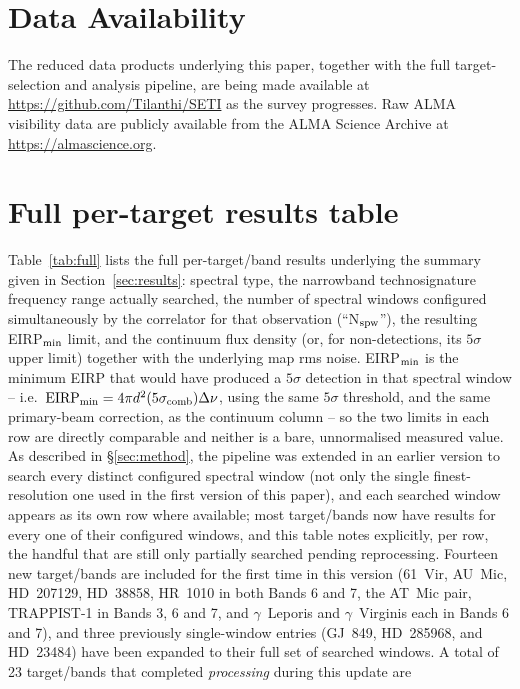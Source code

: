 \documentclass{openjournal}
\begin{document}
\section*{Data Availability}
The reduced data products underlying this paper, together with the full
target-selection and analysis pipeline, are being made available at
\url{https://github.com/Tilanthi/SETI} as the survey progresses. Raw ALMA
visibility data are publicly available from the ALMA Science Archive at
\url{https://almascience.org}.


\appendix
\section{Full per-target results table}
\label{app:table}

Table~\ref{tab:full} lists the full per-target/band results underlying the
summary given in Section~\ref{sec:results}: spectral type, the narrowband
technosignature frequency range actually searched, the number of spectral
windows configured simultaneously by the correlator for that observation
(``N$_{\rm spw}$''), the resulting EIRP$_{\rm min}$ limit, and the
continuum flux density (or, for non-detections, its $5\sigma$ upper
limit) together with the underlying map rms noise. EIRP$_{\rm min}$ is
the minimum EIRP that would have produced a $5\sigma$ detection in that
spectral window -- i.e.\ $\mathrm{EIRP_{min}} = 4\pi d^{2}(5\sigma_{\rm
comb})\Delta\nu$, using the same $5\sigma$ threshold, and the same
primary-beam correction, as the continuum column -- so the two limits in
each row are directly comparable and neither is a bare, unnormalised
measured value. As described in \S\ref{sec:method}, the pipeline was
extended in an earlier version to search every distinct configured
spectral window (not only the single finest-resolution one used in the
first version of this paper), and each searched window appears as its
own row where available; most target/bands now have results for every
one of their configured windows, and this table notes explicitly, per
row, the handful that are still only partially searched pending
reprocessing. Fourteen new target/bands are included for the first time
in this version (61~Vir, AU~Mic, HD~207129, HD~38858, HR~1010 in both
Bands 6 and 7, the AT~Mic pair, TRAPPIST-1 in Bands 3, 6 and 7, and
$\gamma$~Leporis and $\gamma$~Virginis each in Bands 6 and 7), and three
previously single-window entries (GJ~849, HD~285968, and HD~23484) have
been expanded to their full set of searched windows. A total of 23
target/bands that completed \emph{processing} during this update are
\end{document}
